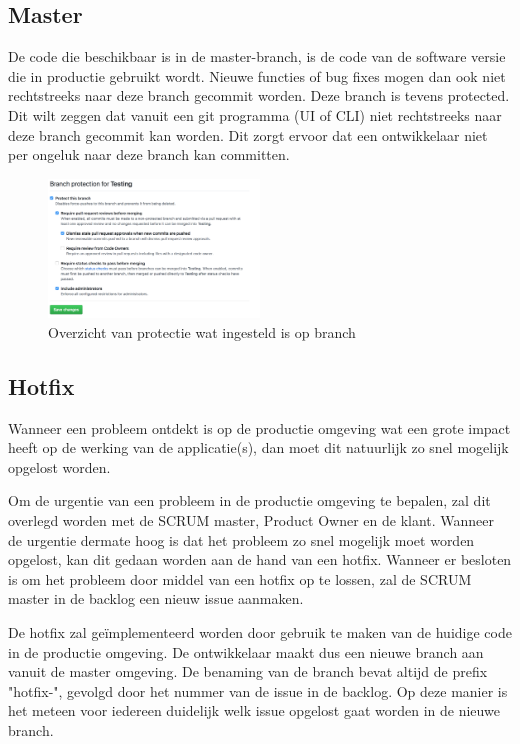	\subsection{Master}
	De code die beschikbaar is in de master-branch, is de code van de software versie die in productie gebruikt wordt. Nieuwe functies of bug fixes mogen dan ook niet rechtstreeks naar deze branch gecommit worden.
	Deze branch is tevens protected. Dit wilt zeggen dat vanuit een git programma (UI of CLI) niet rechtstreeks naar deze branch gecommit kan worden. Dit zorgt ervoor dat een ontwikkelaar niet per ongeluk naar deze branch kan committen.
	
	
	\begin{figure}[H]
		\centering
	\includegraphics[width=0.5\textwidth]{images/BranchProtectionSetup.png}
	\caption{Overzicht van protectie wat ingesteld is op branch}
	\label{fig:BranchProtectionSetup}
	\end{figure}

	\subsection{Hotfix}
	Wanneer een probleem ontdekt is op de productie omgeving wat een grote impact heeft op de werking van de applicatie(s), dan moet dit natuurlijk zo snel mogelijk opgelost worden. 
	
	Om de urgentie van een probleem in de productie omgeving te bepalen, zal dit overlegd worden met de SCRUM master, Product Owner en de klant. Wanneer de urgentie dermate hoog is dat het probleem zo snel mogelijk moet worden opgelost, kan dit gedaan worden aan de hand van een hotfix.
	Wanneer er besloten is om het probleem door middel van een hotfix op te lossen, zal de SCRUM master in de backlog een nieuw issue aanmaken.
	
	De hotfix zal geïmplementeerd worden door gebruik te maken van de huidige code in de productie omgeving. De ontwikkelaar maakt dus een nieuwe branch aan vanuit de master omgeving. De benaming van de branch bevat altijd de prefix "hotfix-", gevolgd door het nummer van de issue in de backlog. Op deze manier is het meteen voor iedereen duidelijk welk issue opgelost gaat worden in de nieuwe branch.
	
